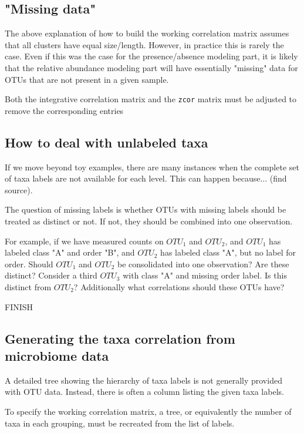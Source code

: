 \documentclass[12pt]{article}
\begin{document}
\subsection{"Missing data"}
The above explanation of how to build the working correlation matrix assumes that all clusters have equal size/length. However, in practice this is rarely the case. Even if this was the case for the presence/absence modeling part, it is likely that the relative abundance modeling part will have essentially "missing" data for OTUs that are not present in a given sample.

Both the integrative correlation matrix and the \texttt{zcor} matrix must be adjusted to remove the corresponding entries


\subsection{How to deal with unlabeled taxa}

If we move beyond toy examples, there are many instances when the complete set of taxa labels are not available for each level. This can happen because... (find source).

The question of missing labels is whether OTUs with missing labels should be treated as distinct or not. If not, they should be combined into one observation.

For example, if we have measured counts on $OTU_1$ and $OTU_2$, and $OTU_1$ has labeled class "A" and order "B", and $OTU_2$ has labeled class "A", but no label for order. Should $OTU_1$ and $OTU_2$ be consolidated into one observation? Are these distinct? Consider a third $OTU_3$ with class "A" and missing order label. Is this distinct from $OTU_2$? Additionally what correlations should these OTUs have?

FINISH



\subsection{Generating the taxa correlation from microbiome data}

A detailed tree showing the hierarchy of taxa labels is not generally provided with OTU data. Instead, there is often a column listing the given taxa labels.

To specify the working correlation matrix, a tree, or equivalently the number of taxa in each grouping, must be recreated from the list of labels.
\end{document}
